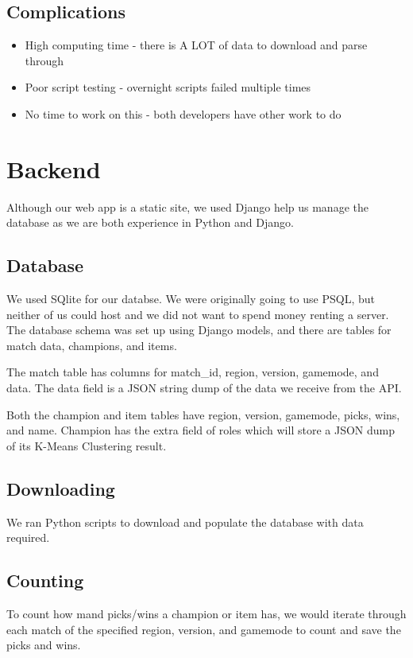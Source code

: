 \documentclass{article}
\begin{document}
\subsection{Complications}
\begin{itemize}
    \item High computing time - there is A LOT of data to download and parse through
    \item Poor script testing - overnight scripts failed multiple times
    \item No time to work on this - both developers have other work to do
\end{itemize}


\section{Backend}
Although our web app is a static site, we used Django help us manage the database as we are both experience in Python and Django.

\subsection{Database}
We used SQlite for our databse. We were originally going to use PSQL, but neither of us could host and we did not want to spend money renting a server. The database schema was set up using Django models, and there are tables for match data, champions, and items. 

The match table has columns for match\_id, region, version, gamemode, and data. The data field is a JSON string dump of the data we receive from the API. 

Both the champion and item tables have region, version, gamemode, picks, wins, and name. Champion has the extra field of roles which will store a JSON dump of its K-Means Clustering result.

\subsection{Downloading}
We ran Python scripts to download and populate the database with data required.

\subsection{Counting}
To count how mand picks/wins a champion or item has, we would iterate through each match of the specified region, version, and gamemode to count and save the picks and wins.
\end{document}
